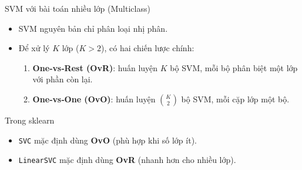 \begin{frame}{SVM với bài toán nhiều lớp (Multiclass)}
  \begin{itemize}
    \item SVM nguyên bản chỉ phân loại nhị phân.
    \item Để xử lý $K$ lớp ($K>2$), có hai chiến lược chính:
      \begin{enumerate}
        \item \textbf{One‑vs‑Rest (OvR)}: huấn luyện $K$ bộ SVM, mỗi bộ phân biệt một lớp với phần còn lại.
        \item \textbf{One‑vs‑One (OvO)}: huấn luyện $\binom{K}{2}$ bộ SVM, mỗi cặp lớp một bộ.
      \end{enumerate}
  \end{itemize}
  \begin{block}{Trong sklearn}
    \begin{itemize}
      \item \texttt{SVC} mặc định dùng \textbf{OvO} (phù hợp khi số lớp ít).
      \item \texttt{LinearSVC} mặc định dùng \textbf{OvR} (nhanh hơn cho nhiều lớp).
    \end{itemize}
  \end{block}
\end{frame}